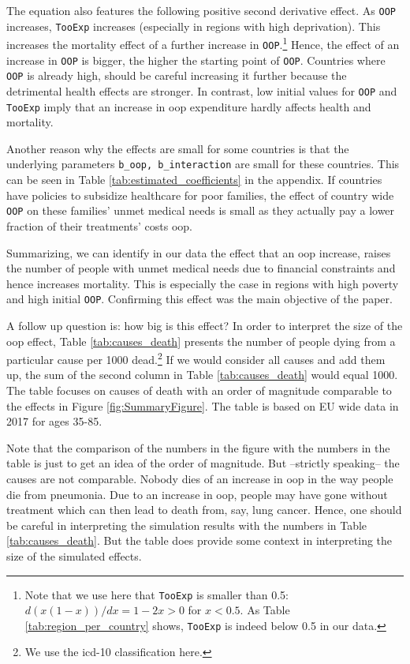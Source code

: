 \documentclass[a4paper,12pt]{article}
\begin{document}
The equation also features the following positive second derivative effect. As \texttt{OOP} increases, \texttt{TooExp} increases (especially in regions with high deprivation). This increases the mortality effect of a further increase in \texttt{OOP}.\footnote{Note that we use here that \texttt{TooExp} is smaller than 0.5: \(d(x(1-x))/dx = 1-2x >0\) for \(x<0.5\). As Table \ref{tab:region_per_country} shows, \texttt{TooExp} is indeed below 0.5 in our data.} Hence, the effect of an increase in \texttt{OOP} is bigger, the higher the starting point of \texttt{OOP}. Countries where \texttt{OOP} is already high, should be careful increasing it further because the detrimental health effects are stronger. In contrast, low initial values for \texttt{OOP} and \texttt{TooExp} imply that an increase in oop expenditure hardly affects health and mortality.

Another reason why the effects are small for some countries is that the underlying parameters \texttt{b\_oop, b\_interaction} are small for these countries. This can be seen in Table \ref{tab:estimated_coefficients} in the appendix. If countries have policies to subsidize healthcare for poor families, the effect of country wide \texttt{OOP} on these families' unmet medical needs is small as they actually pay a lower fraction of their treatments' costs oop. 

Summarizing, we can identify in our data the effect that an oop increase, raises the number of people with unmet medical needs due to financial constraints and hence increases mortality. This is especially the case in regions with high poverty and high initial \texttt{OOP}. Confirming this effect was the main objective of the paper.

A follow up question is: how big is this effect? In order to interpret the size of the oop effect, Table \ref{tab:causes_death} presents the number of people dying from a particular cause per 1000 dead.\footnote{We use the icd-10 classification here.} If we would consider all causes and add them up, the sum of the second column in Table \ref{tab:causes_death} would equal 1000. The table focuses on causes of death with an order of magnitude comparable to the effects in Figure \ref{fig:SummaryFigure}. The table is based on EU wide data in 2017 for ages 35-85. 

Note that the comparison of the numbers in the figure with the numbers in the table is just to get an idea of the order of magnitude. But --strictly speaking-- the causes are not comparable. Nobody dies of an increase in oop in the way people die from pneumonia. Due to an increase in oop, people may have gone without treatment which can then lead to death from, say, lung cancer. Hence, one should be careful in interpreting the simulation results with the numbers in Table \ref{tab:causes_death}. But the table does provide some context in interpreting the size of the simulated effects.
\end{document}
